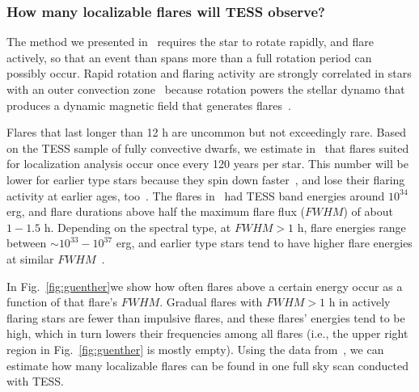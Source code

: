 \documentclass[proof]{WileyASNA-v1}
\newcommand{\jdag}[1]{\textcolor{darkred}{#1}}
\begin{document}
\subsubsection{How many localizable flares will TESS observe?}
The method we presented in~\citet{ilin2021b} requires the star to rotate rapidly, and flare actively, so that an event than spans more than a full rotation period can possibly occur. 
Rapid rotation and flaring activity are strongly correlated in stars with an outer convection zone~\citep{doorsselaere2017} because rotation powers the stellar dynamo that produces a dynamic magnetic field that generates flares~\citep{parker1955}.%

Flares that last longer than 12 h are uncommon but not exceedingly rare.
Based on the TESS sample of fully convective dwarfs, we estimate in~\citet{ilin2021b} that flares suited for localization analysis occur once every 120 years per star. This number will be lower for earlier type stars because they spin down faster~\citep{barnes2003,reiners2008}, and lose their flaring activity at earlier ages, too~\citep{hilton2010,chang2015,ilin2019,ilin2021}. %
The flares in~\citet{ilin2021b} had TESS band energies around $10^{34}$ erg, and flare durations above half the maximum flare flux ($FWHM$) of about $1-1.5$ h. %
Depending on the spectral type, at $FWHM > 1$ h, flare energies range between $\sim 10^{33}-10^{37}$ erg, and earlier type stars tend to have higher flare energies at similar $FWHM$~\citep{guenther2020}.

In Fig.~\ref{fig:guenther}we show how often flares above a certain energy occur as a function of that flare's $FWHM$. Gradual flares with $FWHM > 1$ h in actively flaring stars are fewer than impulsive flares, and these flares' energies tend to be high, which in turn lowers their frequencies among all flares (i.e., the upper right region in Fig.~\ref{fig:guenther} is mostly empty). Using the data from~\citet{guenther2020}, we can estimate how many localizable flares can be found in one full sky scan conducted with TESS.
\end{document}
